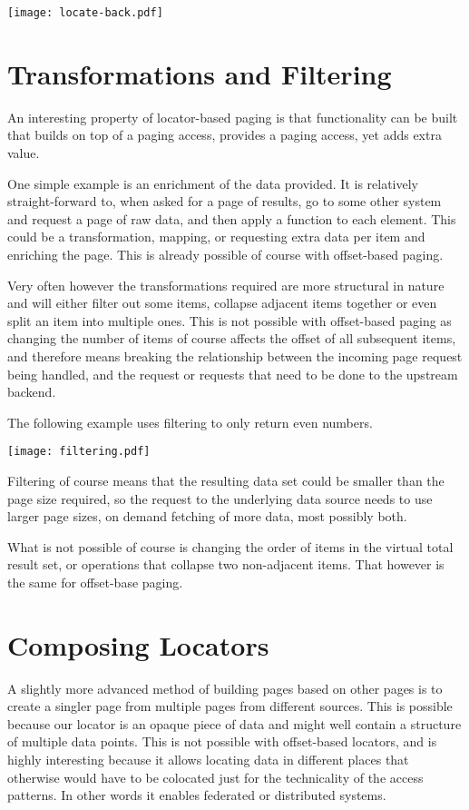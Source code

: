 \documentclass[11pt,a4paper]{article}
\begin{document}
\begin{multicols*}{2}
\texttt{[image: locate-back.pdf]}

\section*{Transformations and Filtering}

An interesting property of locator-based paging is that functionality can be
built that builds on top of a paging access, provides a paging access, yet adds
extra value.

One simple example is an enrichment of the data provided. It is relatively
straight-forward to, when asked for a page of results, go to some other system
and request a page of raw data, and then apply a function to each element. This
could be a transformation, mapping, or requesting extra data per item and
enriching the page. This is already possible of course with offset-based
paging.

Very often however the transformations required are more structural in nature
and will either filter out some items, collapse adjacent items together or even
split an item into multiple ones. This is not possible with offset-based paging
as changing the number of items of course affects the offset of all subsequent
items, and therefore means breaking the relationship between the incoming page
request being handled, and the request or requests that need to be done to the
upstream backend.

The following example uses filtering to only return even numbers.

\texttt{[image: filtering.pdf]}

Filtering of course means that the resulting data set could be smaller than the
page size required, so the request to the underlying data source needs to use
larger page sizes, on demand fetching of more data, most possibly both.

What is not possible of course is changing the order of items in the virtual
total result set, or operations that collapse two non-adjacent items. That
however is the same for offset-base paging.

\section*{Composing Locators}

A slightly more advanced method of building pages based on other pages is to
create a singler page from multiple pages from different sources. This is
possible because our locator is an opaque piece of data and might well contain a
structure of multiple data points. This is not possible with offset-based
locators, and is highly interesting because it allows locating data in different
places that otherwise would have to be colocated just for the technicality of
the access patterns. In other words it enables federated or distributed systems.


\end{multicols*}
\end{document}
